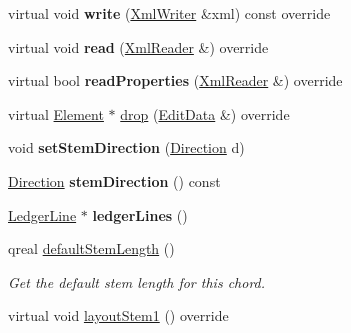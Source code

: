\begin{DoxyCompactItemize}
\mbox{\label{class_ms_1_1_chord_a3f7d846cb9ebf231bc0afd9d52835bdf}} 
virtual void {\bfseries write} (\hyperlink{class_ms_1_1_xml_writer}{Xml\+Writer} \&xml) const override
\item 
\mbox{\label{class_ms_1_1_chord_a574cec05d2711e9ed02e8ddd9e4d0123}} 
virtual void {\bfseries read} (\hyperlink{class_ms_1_1_xml_reader}{Xml\+Reader} \&) override
\item 
\mbox{\label{class_ms_1_1_chord_a58158af60d26094dea8eb778222e6d44}} 
virtual bool {\bfseries read\+Properties} (\hyperlink{class_ms_1_1_xml_reader}{Xml\+Reader} \&) override
\item 
virtual \hyperlink{class_ms_1_1_element}{Element} $\ast$ \hyperlink{class_ms_1_1_chord_ac91b212e92e0840f3ffd4f4751af8a39}{drop} (\hyperlink{class_ms_1_1_edit_data}{Edit\+Data} \&) override
\item 
\mbox{\label{class_ms_1_1_chord_ac77462915c4e2927cb96da1cad3b71c6}} 
void {\bfseries set\+Stem\+Direction} (\hyperlink{class_ms_1_1_direction}{Direction} d)
\item 
\mbox{\label{class_ms_1_1_chord_a722c73034ff13507a1336593e6af9567}} 
\hyperlink{class_ms_1_1_direction}{Direction} {\bfseries stem\+Direction} () const
\item 
\mbox{\label{class_ms_1_1_chord_ae0820abe69d5138d69187901f2a4ac2c}} 
\hyperlink{class_ms_1_1_ledger_line}{Ledger\+Line} $\ast$ {\bfseries ledger\+Lines} ()
\item 
\mbox{\label{class_ms_1_1_chord_a21d940a0a05368566d47994b61eb92e6}} 
qreal \hyperlink{class_ms_1_1_chord_a21d940a0a05368566d47994b61eb92e6}{default\+Stem\+Length} ()
\begin{DoxyCompactList}\small\item\em Get the default stem length for this chord. \end{DoxyCompactList}\item 
\mbox{\label{class_ms_1_1_chord_a185fc7776084b28c2f33003434729ffe}} 
virtual void \hyperlink{class_ms_1_1_chord_a185fc7776084b28c2f33003434729ffe}{layout\+Stem1} () override

\end{DoxyCompactItemize}
